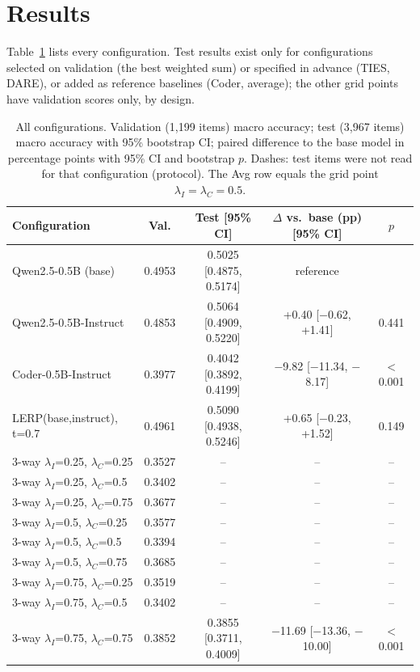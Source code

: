 \documentclass[conference]{IEEEtran}
\begin{document}
\section{Results}
Table~\ref{tab:all} lists every configuration. Test results exist only for configurations selected on validation (the best weighted sum) or specified in advance (TIES, DARE), or added as reference baselines (Coder, average); the other grid points have validation scores only, by design.

\begin{table}[!t]
\caption{All configurations. Validation (1{,}199 items) macro accuracy; test (3{,}967 items) macro accuracy with 95\% bootstrap CI; paired difference to the base model in percentage points with 95\% CI and bootstrap $p$. Dashes: test items were not read for that configuration (protocol). The Avg row equals the grid point $\lambda_I=\lambda_C=0.5$.}
\label{tab:all}
\centering\small
\begin{tabular}{lcccc}
\toprule
Configuration & Val. & Test [95\% CI] & $\Delta$ vs.\ base (pp) [95\% CI] & $p$ \\
\midrule
Qwen2.5-0.5B (base) & 0.4953 & 0.5025 [0.4875, 0.5174] & reference &  \\
Qwen2.5-0.5B-Instruct & 0.4853 & 0.5064 [0.4909, 0.5220] & +0.40 [$-$0.62, +1.41] & 0.441 \\
Coder-0.5B-Instruct & 0.3977 & 0.4042 [0.3892, 0.4199] & $-$9.82 [$-$11.34, $-$8.17] & $<$0.001 \\
LERP(base,instruct), t=0.7 & 0.4961 & 0.5090 [0.4938, 0.5246] & +0.65 [$-$0.23, +1.52] & 0.149 \\
\midrule
3-way $\lambda_I$=0.25, $\lambda_C$=0.25 & 0.3527 & -- & -- & -- \\
3-way $\lambda_I$=0.25, $\lambda_C$=0.5 & 0.3402 & -- & -- & -- \\
3-way $\lambda_I$=0.25, $\lambda_C$=0.75 & 0.3677 & -- & -- & -- \\
3-way $\lambda_I$=0.5, $\lambda_C$=0.25 & 0.3577 & -- & -- & -- \\
3-way $\lambda_I$=0.5, $\lambda_C$=0.5 & 0.3394 & -- & -- & -- \\
3-way $\lambda_I$=0.5, $\lambda_C$=0.75 & 0.3685 & -- & -- & -- \\
3-way $\lambda_I$=0.75, $\lambda_C$=0.25 & 0.3519 & -- & -- & -- \\
3-way $\lambda_I$=0.75, $\lambda_C$=0.5 & 0.3402 & -- & -- & -- \\
3-way $\lambda_I$=0.75, $\lambda_C$=0.75 & 0.3852 & 0.3855 [0.3711, 0.4009] & $-$11.69 [$-$13.36, $-$10.00] & $<$0.001 \\

\end{tabular}
\end{table}
\end{document}
